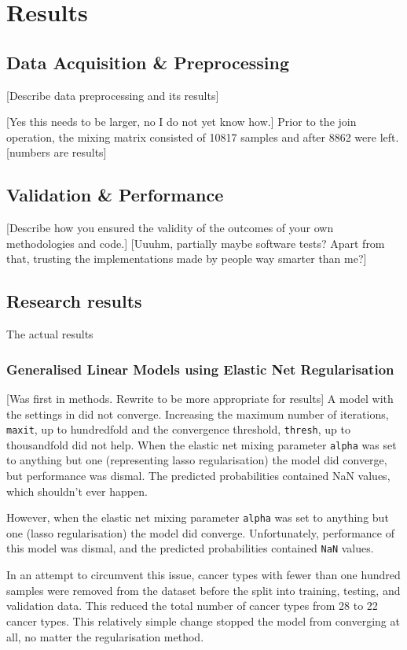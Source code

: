 \chapter{Results}

\section{Data Acquisition \& Preprocessing}
[Describe data preprocessing and its results]

[Yes this needs to be larger, no I do not yet know how.]
Prior to the join operation, the mixing matrix consisted of 10817 samples and after 8862 were left. [numbers are results]

\section{Validation \& Performance}
[Describe how you ensured the validity of the outcomes of your own methodologies and code.]
[Uuuhm, partially maybe software tests? Apart from that, trusting the implementations made by people way smarter than me?]

\section{Research results}
The actual results

\subsection{Generalised Linear Models using Elastic Net Regularisation} \label{sec:results:glmnet}
[Was first in methods. Rewrite to be more appropriate for results]
A model with the settings in  did not converge. Increasing the maximum number of iterations, \verb|maxit|, up to hundredfold and the convergence threshold, \verb|thresh|, up to thousandfold did not help.
When the elastic net mixing parameter \verb|alpha| was set to anything but one (representing lasso regularisation) the model did converge, but performance was dismal.
The predicted probabilities contained NaN values, which shouldn't ever happen.

However, when the elastic net mixing parameter \verb|alpha| was set to anything but one (lasso regularisation) the model did converge.
Unfortunately, performance of this model was dismal, and the predicted probabilities contained \verb|NaN| values.

In an attempt to circumvent this issue, cancer types with fewer than one hundred samples were removed from the dataset before the split into training, testing, and validation data.
This reduced the total number of cancer types from 28 to 22 cancer types.
This relatively simple change stopped the model from converging at all, no matter the regularisation method.

